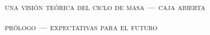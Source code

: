 \documentclass[xcolor=dvipsnames,4pt,hyperref={colorlinks,citecolor=black,linkcolor=black,urlcolor=black}]{beamer}
\begin{document}
\begin{frame}{\textsc{una visión teórica del ciclo de masa --- caja abierta}}
%
\end{frame}

\begin{frame}{\textsc{prólogo --- expectativas para el futuro}}
%
%
\end{frame}

\end{document}
